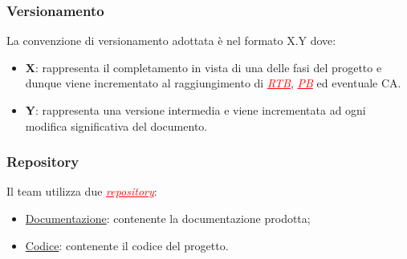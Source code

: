 \subsubsection{Versionamento}
La convenzione di versionamento adottata è nel formato X.Y dove:
\begin{itemize}
    \item \textbf{X}: rappresenta il completamento in vista di una delle fasi del progetto e dunque viene incrementato al raggiungimento di
    \textcolor{red}{\uline{\textit{RTB}}}, \textcolor{red}{\uline{\textit{PB}}} ed eventuale CA.
    \item \textbf{Y}: rappresenta una versione intermedia e viene incrementata ad ogni modifica significativa del documento.
\end{itemize}

\subsubsection{Repository}
Il team utilizza due \textcolor{red}{\uline{\textit{repository}}}:
\begin{itemize}
    \item \href{https://github.com/7Last/docs.git}{Documentazione}: contenente la documentazione prodotta;
    \item \href{https://github.com/7Last/7Last.github.io.git}{Codice}: contenente il codice del progetto.
\end{itemize}

